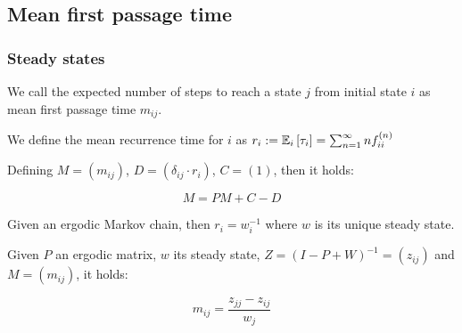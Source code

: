 \subsection{Mean first passage time}
 \begin{frame}\frametitle{Steady states}
    \vspace{2em}
    
    \begin{definition}
    We call the expected number of steps to reach a state \(j\) from initial state 
    \(i\) as mean first passage time \(m_{ij}\).
    
    We define the mean recurrence time for \(i\) as
    \(r_{i} := \mathbb{E}_i\left[{\tau_{i}}\right] = \sum_{n = 1}^{\infty} n f_{ii}^{(n)}\)
    \end{definition}
    
    \begin{proposition}
    Defining \(M = (m_{ij})\), \(D = (\delta_{ij} \cdot r_i)\), \(C = (1) \), then 
    it holds:
    
    \[
    M = PM + C - D
    \]
    \end{proposition}
    
    \begin{proposition}
    Given an ergodic Markov chain, then \(r_i = w_i^{-1}\) where \(w\) is its unique steady state.
    \end{proposition}

    \begin{theorem}
    Given \(P\) an ergodic matrix, \(w\) its steady state, \(Z = (I - P + W)^{-1} = (z_{ij})\) and \(M = (m_{ij})\), it holds:

    \[ m_{ij} = \frac{z_{jj} - z_{ij}}{w_j} \]
    \end{theorem}
    
\end{frame}
